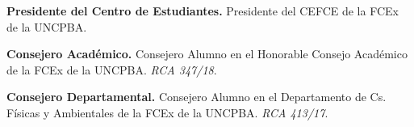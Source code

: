 \textbf{Presidente del Centro de Estudiantes.} Presidente del CEFCE de la FCEx de la UNCPBA.

\textbf{Consejero Académico.} Consejero Alumno en el Honorable Consejo Académico de la FCEx de la UNCPBA. \textit{RCA 347/18}.

\textbf{Consejero Departamental.} Consejero Alumno en el Departamento de Cs. Físicas y Ambientales de la FCEx de la UNCPBA. \textit{RCA 413/17}.